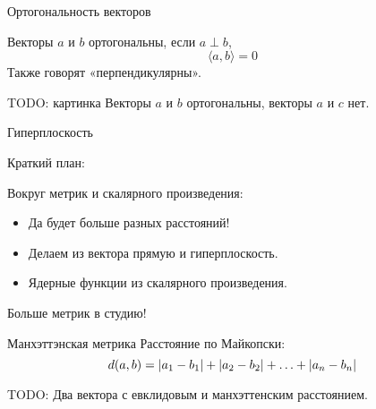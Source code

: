 \documentclass[14pt,xcolor=dvipsnames]{beamer}
\begin{document}





\begin{frame}{Ортогональность векторов}
  
\begin{block}{Векторы $a$ и $b$ ортогональны, если $a\perp b$,}
\[
  \langle a, b \rangle =0
\]
Также говорят «перпендикулярны».
\end{block}
  
\begin{block}{TODO: картинка}
Векторы $a$ и $b$ ортогональны, векторы $a$ и $c$ нет.
\end{block}

\end{frame}
  




\begin{frame}
  Гиперплоскость 
\end{frame}

\begin{frame}{Краткий план:}

\begin{block}{Вокруг метрик и скалярного произведения:}
\begin{itemize}[<+->]
  \item Да будет больше разных расстояний!
  \item Делаем из вектора прямую и гиперплоскость.
  \item Ядерные функции из скалярного произведения.
\end{itemize}
\end{block}

\end{frame}


\begin{frame}{Больше метрик в студию!}
 \begin{block}{Манхэттэнская метрика}
  Расстояние по Майкопски:
  \[
  d(a, b) = \abs{a_1 - b_1}  + \abs{a_2 - b_2} + \ldots + \abs{a_n - b_n}
  \]
 \end{block}

\begin{block}{TODO:}
  Два вектора с евклидовым и манхэттенским расстоянием.
\end{block}
 
\end{frame}
\end{document}
